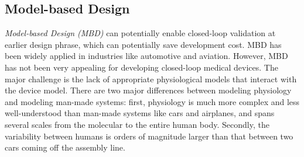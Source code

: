 \documentclass[a4paper]{article}
\begin{document}
\subsection{Model-based Design}
\emph{Model-based Design (MBD)} can potentially enable closed-loop validation at earlier design phrase, which can potentially save development cost.
MBD has been widely applied in industries like automotive and aviation. 
However, MBD has not been very appealing for developing closed-loop medical devices.
The major challenge is the lack of appropriate physiological models that interact with the device model.
There are two major differences between modeling physiology and modeling man-made systems:
first, physiology is much more complex and less well-understood than man-made systems like cars and airplanes, and spans several scales from the molecular to the entire human body.
Secondly, the variability between humans is orders of magnitude larger than that between two cars coming off the assembly line.




\end{document}
